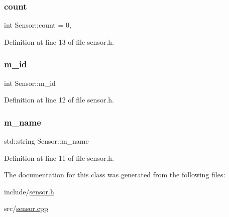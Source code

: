\subsubsection{\texorpdfstring{count}{count}}
{\footnotesize\ttfamily int Sensor\+::count = 0\hspace{0.3cm}{\ttfamily [static]}, {\ttfamily [protected]}}



Definition at line 13 of file sensor.\+h.

\mbox{\label{class_sensor_a3d1ebe0e05e5d75604330a70d3acf9e5}} 
\subsubsection{\texorpdfstring{m\+\_\+id}{m\_id}}
{\footnotesize\ttfamily int Sensor\+::m\+\_\+id\hspace{0.3cm}{\ttfamily [protected]}}



Definition at line 12 of file sensor.\+h.

\mbox{\label{class_sensor_a364a2c3d5e77d1af61f2532a130c2836}} 
\subsubsection{\texorpdfstring{m\+\_\+name}{m\_name}}
{\footnotesize\ttfamily std\+::string Sensor\+::m\+\_\+name\hspace{0.3cm}{\ttfamily [protected]}}



Definition at line 11 of file sensor.\+h.



The documentation for this class was generated from the following files\+:\begin{DoxyCompactItemize}
\item 
include/\hyperlink{sensor_8h}{sensor.\+h}\item 
src/\hyperlink{sensor_8cpp}{sensor.\+cpp}\end{DoxyCompactItemize}
